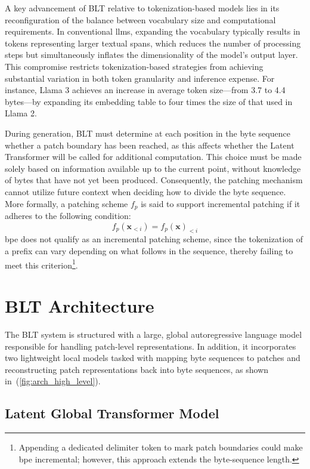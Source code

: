 A key advancement of {\textsc BLT} relative to tokenization-based models lies in its reconfiguration of the balance between vocabulary size and computational requirements. In conventional llms, expanding the vocabulary typically results in tokens representing larger textual spans, which reduces the number of processing steps but simultaneously inflates the dimensionality of the model’s output layer. This compromise restricts tokenization-based strategies from achieving substantial variation in both token granularity and inference expense. For instance, Llama 3 achieves an increase in average token size—from 3.7 to 4.4 bytes—by expanding its embedding table to four times the size of that used in Llama 2.

During generation, {\textsc BLT} must determine at each position in the byte sequence whether a patch boundary has been reached, as this affects whether the Latent Transformer will be called for additional computation. This choice must be made solely based on information available up to the current point, without knowledge of bytes that have not yet been produced. Consequently, the patching mechanism cannot utilize future context when deciding how to divide the byte sequence. More formally, a patching scheme $f_p$ is said to support incremental patching if it adheres to the following condition:
$$f_p(\pmb{x}_{<i}) = f_p(\pmb{x})_{<i}$$
bpe does not qualify as an incremental patching scheme, since the tokenization of a prefix can vary depending on what follows in the sequence, thereby failing to meet this criterion\footnote{Appending a dedicated delimiter token to mark patch boundaries could make bpe incremental; however, this approach extends the byte-sequence length.}.

\section{{\textsc BLT} Architecture}
\label{section:architecture}
The {\textsc BLT} system is structured with a large, global autoregressive language model responsible for handling patch-level representations. In addition, it incorporates two lightweight local models tasked with mapping byte sequences to patches and reconstructing patch representations back into byte sequences, as shown in~(\autoref{fig:arch_high_level}).

\subsection{Latent Global Transformer Model}

